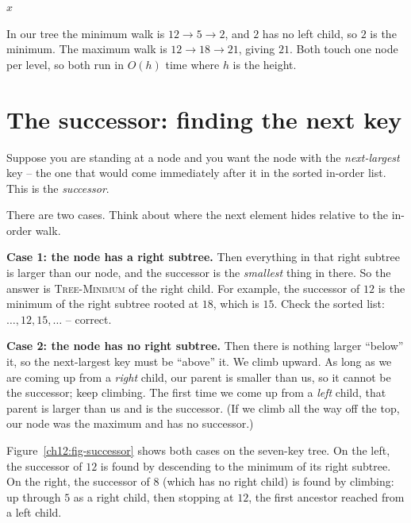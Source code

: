 \begin{algorithm}[H]
\caption{\textsc{Tree-Minimum}($x$)}
\Return $x$\;
\end{algorithm}

In our tree the minimum walk is $12 \to 5 \to 2$, and $2$ has no left child, so $2$ is the
minimum. The maximum walk is $12 \to 18 \to 21$, giving $21$. Both touch one node per level,
so both run in $O(h)$ time where $h$ is the height.

\section{The successor: finding the next key}

Suppose you are standing at a node and you want the node with the \emph{next-largest} key --
the one that would come immediately after it in the sorted in-order list. This is the
\emph{successor}.

There are two cases. Think about where the next
element hides relative to the in-order walk.

\textbf{Case 1: the node has a right subtree.} Then everything in that right subtree is
larger than our node, and the successor is the \emph{smallest} thing in there. So the answer
is \textsc{Tree-Minimum} of the right child. For example, the successor of $12$ is the
minimum of the right subtree rooted at $18$, which is $15$. Check the sorted list:
$\ldots,12,15,\ldots$ -- correct.

\textbf{Case 2: the node has no right subtree.} Then there is nothing larger ``below'' it, so
the next-largest key must be ``above'' it. We climb upward. As long as we are coming up from
a \emph{right} child, our parent is smaller than us, so it cannot be the successor; keep
climbing. The first time we come up from a \emph{left} child, that parent is larger than us
and is the successor. (If we climb all the way off the top, our node was the maximum and has
no successor.)

Figure~\ref{ch12:fig-successor} shows both cases on the seven-key tree. On the left, the
successor of $12$ is found by descending to the minimum of its right subtree. On the right,
the successor of $8$ (which has no right child) is found by climbing: up through $5$ as a
right child, then stopping at $12$, the first ancestor reached from a left child.

